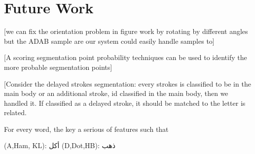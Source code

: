 \documentclass[journal,compsoc]{IEEEtran}
\begin{document}
\section{Future Work}
[we can fix the orientation problem in figure work by rotating by different angles but the ADAB sample are our system could easily handle samples to]

[A scoring segmentation point probability techniques can be used to identify the more probable segmentation points]

[Consider the delayed strokes segmentation: every strokes is classified to be in the main body or an additional stroke, id classified in the main body, then we handled it. If classified as a delayed stroke, it should be matched to the letter is related.

For every word, the key a serious of features such that

(A,Ham, KL): أكل
(D,Dot,HB): ذهب




\end{document}
